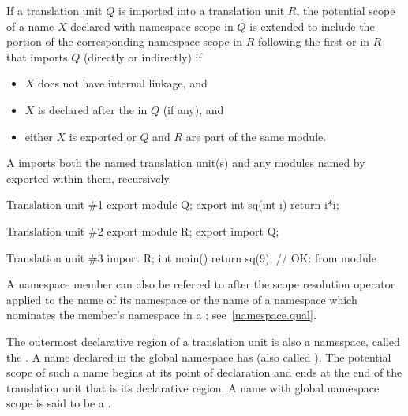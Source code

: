 \pnum
If a translation unit $Q$ is imported into a translation unit $R$,
the potential scope of a name $X$ declared with namespace scope in $Q$
is extended to include the portion of the corresponding namespace
scope in $R$ following the first 
or 
in $R$ that imports $Q$ (directly or indirectly) if
\begin{itemize}
\item $X$ does not have internal linkage, and
\item $X$ is declared after the  in $Q$ (if any), and
\item either $X$ is exported or $Q$ and $R$ are part of the same module.
\end{itemize}
\begin{note}
A  imports both
the named translation unit(s) and
any modules named by exported
 within them,
recursively.
\begin{example}
\begin{codeblocktu}{Translation unit \#1}
export module Q;
export int sq(int i) { return i*i; }
\end{codeblocktu}

\begin{codeblocktu}{Translation unit \#2}
export module R;
export import Q;
\end{codeblocktu}

\begin{codeblocktu}{Translation unit \#3}
import R;
int main() { return sq(9); }    // OK:  from module 
\end{codeblocktu}
\end{example}
\end{note}

\pnum
A namespace member can also be referred to after the \tcode{::} scope
resolution operator applied to the name of its
namespace or the name of a namespace which nominates the member's
namespace in a ; see~\ref{namespace.qual}.

\pnum
The outermost declarative region of a translation unit is also a
namespace, called the . A name declared in
the global namespace has  (also called
). The potential scope of such a name begins at
its point of declaration and ends at the end
of the translation unit that is its declarative region.
A name with global namespace scope is said to be a
.

